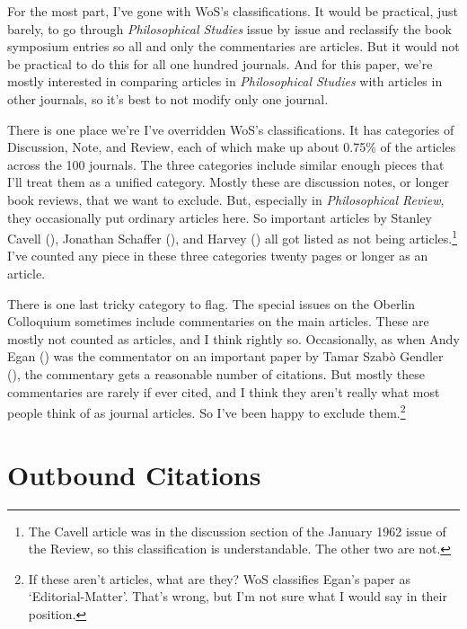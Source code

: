 \documentclass[
  11pt,
  letterpaper,
  DIV=11,
  numbers=noendperiod,
  twoside]{scrartcl}
\begin{document}
For the most part, I've gone with WoS's classifications. It would be
practical, just barely, to go through \emph{Philosophical Studies} issue
by issue and reclassify the book symposium entries so all and only the
commentaries are articles. But it would not be practical to do this for
all one hundred journals. And for this paper, we're mostly interested in
comparing articles in \emph{Philosophical Studies} with articles in
other journals, so it's best to not modify only one journal.

There is one place we're I've overridden WoS's classifications. It has
categories of Discussion, Note, and Review, each of which make up about
0.75\% of the articles across the 100 journals. The three categories
include similar enough pieces that I'll treat them as a unified
category. Mostly these are discussion notes, or longer book reviews,
that we want to exclude. But, especially in \emph{Philosophical Review},
they occasionally put ordinary articles here. So important articles by
Stanley Cavell (), Jonathan
Schaffer (), and Harvey
() all
got listed as not being articles.\footnote{The Cavell article was in the
  discussion section of the January 1962 issue of the Review, so this
  classification is understandable. The other two are not.} I've counted
any piece in these three categories twenty pages or longer as an
article.

There is one last tricky category to flag. The special issues on the
Oberlin Colloquium sometimes include commentaries on the main articles.
These are mostly not counted as articles, and I think rightly so.
Occasionally, as when Andy Egan () was the
commentator on an important paper by Tamar Szabò Gendler
(), the commentary gets a
reasonable number of citations. But mostly these commentaries are rarely
if ever cited, and I think they aren't really what most people think of
as journal articles. So I've been happy to exclude them.\footnote{If
  these aren't articles, what are they? WoS classifies Egan's paper as
  `Editorial-Matter'. That's wrong, but I'm not sure what I would say in
  their position.}

\section{Outbound Citations}\label{sec-outbound}
\end{document}
